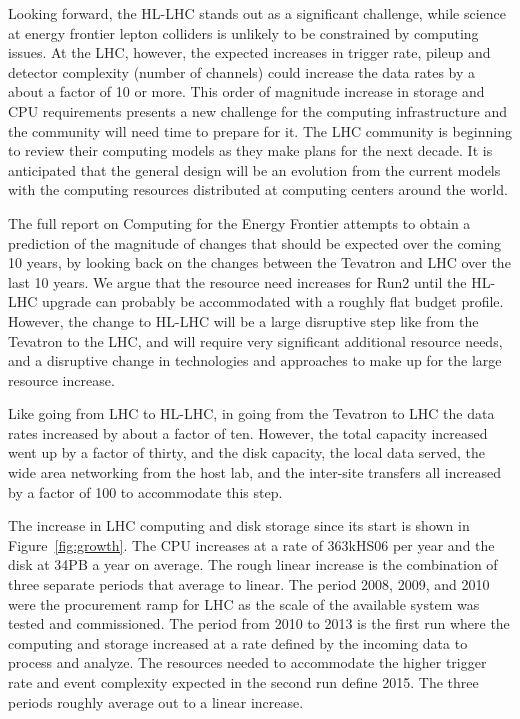 Looking forward, the HL-LHC stands out as a significant challenge, while
science at energy frontier lepton colliders is unlikely to be constrained by
computing issues. 
At the LHC, however, the expected increases in trigger rate, pileup and detector
complexity (number of channels) could increase the data rates by a about a
factor of 10 or more.   This order of magnitude increase in storage and CPU
requirements presents a new challenge for the computing infrastructure and the
community will need time to prepare for it. The LHC community is beginning to
review their computing models as they make plans for the next decade.  It is
anticipated that the general design will be an evolution from the current
models with the computing resources distributed at computing centers around
the world.

The full report on Computing for the Energy Frontier attempts 
to obtain a prediction of the magnitude of
changes that should be expected over the coming 10 years, by looking back on 
the changes between the Tevatron and LHC over the last 10 years. We argue that 
the resource need increases for Run2 until the HL-LHC upgrade can probably be 
accommodated with a roughly flat budget profile. However, the change to HL-LHC
will be a large disruptive step like from the Tevatron to the LHC, and will require
very significant additional resource needs, and a disruptive change in
technologies and approaches to make up for the large resource increase. 

Like going from LHC to HL-LHC, in going from the Tevatron to LHC 
the data rates increased by about a factor of ten. However, 
the total capacity increased went up by a factor of thirty, 
and the disk capacity, the local data served, the wide area
networking from the host lab, and the inter-site transfers all
increased by a factor of 100 to accommodate this step. 

The increase in LHC computing and disk storage since its start is shown in
Figure~\ref{fig:growth}.  The CPU increases at a rate of 363kHS06 per
year and the disk at 34PB a year on average.  The rough linear
increase is the combination of three separate periods that average to
linear.  The period 2008, 2009, and 2010 were the procurement ramp for
LHC as the scale of the available system was tested and commissioned.
The period from 2010 to 2013 is the first run where the computing and
storage increased at a rate defined by the incoming data to process
and analyze.  The resources needed to accommodate the higher trigger
rate and event complexity expected in the second run define 2015.  The
three periods roughly average out to a linear increase.

